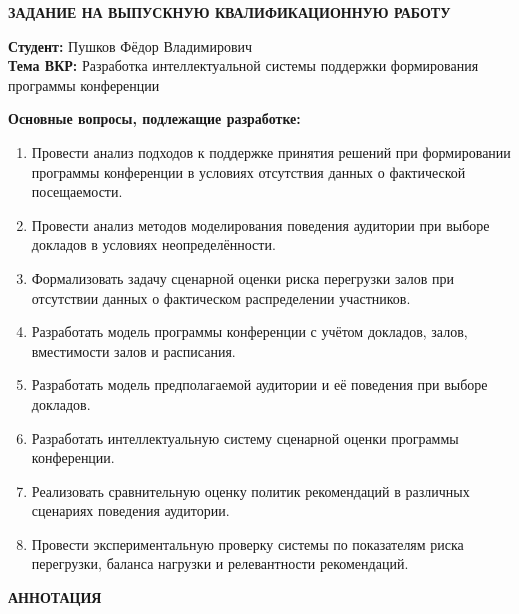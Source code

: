 \pagestyle{empty}
\thispagestyle{empty}

\begin{center}
\textbf{ЗАДАНИЕ НА ВЫПУСКНУЮ КВАЛИФИКАЦИОННУЮ РАБОТУ}
\end{center}

\vspace{0.5em}

\noindent\textbf{Студент:} Пушков Фёдор Владимирович\\[0.3em]
\textbf{Тема ВКР:} Разработка интеллектуальной системы поддержки формирования программы конференции

\vspace{1em}

\noindent\textbf{Основные вопросы, подлежащие разработке:}

\begin{enumerate}
\item Провести анализ подходов к поддержке принятия решений при формировании программы конференции в условиях отсутствия данных о фактической посещаемости.
\item Провести анализ методов моделирования поведения аудитории при выборе докладов в условиях неопределённости.
\item Формализовать задачу сценарной оценки риска перегрузки залов при отсутствии данных о фактическом распределении участников.
\item Разработать модель программы конференции с учётом докладов, залов, вместимости залов и расписания.
\item Разработать модель предполагаемой аудитории и её поведения при выборе докладов.
\item Разработать интеллектуальную систему сценарной оценки программы конференции.
\item Реализовать сравнительную оценку политик рекомендаций в различных сценариях поведения аудитории.
\item Провести экспериментальную проверку системы по показателям риска перегрузки, баланса нагрузки и релевантности рекомендаций.
\end{enumerate}

\clearpage
\thispagestyle{empty}

\begin{center}
\textbf{АННОТАЦИЯ}
\end{center}

